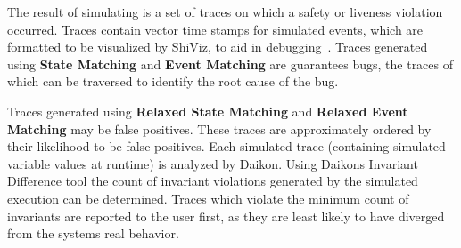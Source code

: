 The result of simulating is a set of traces on which a safety or liveness
violation occurred. Traces contain vector time stamps for simulated events,
which are formatted to be visualized by ShiViz, to aid in
debugging~\cite{Abrahamson_sheddinglight}. Traces generated using \textbf{State
Matching} and \textbf{Event Matching} are guarantees bugs, the traces of which
can be traversed to identify the root cause of the bug. 

Traces generated using \textbf{Relaxed State Matching} and \textbf{Relaxed
Event Matching} may be false positives. These traces are approximately ordered by
their likelihood to be false positives. Each simulated trace (containing
simulated variable values at runtime) is analyzed by Daikon. Using Daikons
Invariant Difference tool the count of invariant violations generated by the
simulated execution can be determined. Traces which violate the minimum count
of invariants are reported to the user first, as they are least likely to have
diverged from the systems real behavior.


